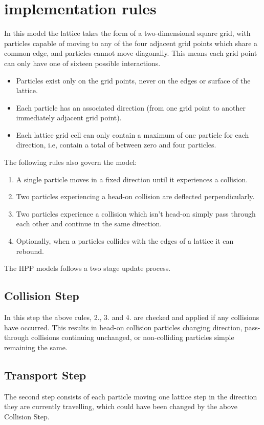 \documentclass[paper=a4, fontsize=11pt]{scrartcl} %
\numberwithin{equation}{section} %
\numberwithin{figure}{section} %
\numberwithin{table}{section} %
\begin{document}
\section{implementation rules}
In this model the lattice takes the form of a two-dimensional square grid, with particles capable of moving to any of the four adjacent grid points which share a common edge, and particles cannot move diagonally. This means each grid point can only have one of sixteen possible interactions.
\begin{itemize}
	\item Particles exist only on the grid points, never on the edges or surface of the lattice.
	\item Each particle has an associated direction (from one grid point to another immediately adjacent grid point).
	\item Each lattice grid cell can only contain a maximum of one particle for each direction, i.e, contain a total of between zero and four particles.
\end{itemize}
The following rules also govern the model:
\begin{enumerate}
	\item A single particle moves in a fixed direction until it experiences a collision.
	\item Two particles experiencing a head-on collision are deflected perpendicularly.
	\item Two particles experience a collision which isn't head-on simply pass through each other and continue in the same direction.
	\item Optionally, when a particles collides with the edges of a lattice it can rebound.
\end{enumerate}
The HPP models follows a two stage update process. \cite{wiki-hpp}

\subsection{Collision Step}
In this step the above rules, 2., 3. and 4. are checked and applied if any collisions have occurred. This results in head-on collision particles changing direction, pass-through collisions continuing unchanged, or non-colliding particles simple remaining the same. \cite{wiki-hpp}

\subsection{Transport Step}
The second step consists of each particle moving one lattice step in the direction they are currently travelling, which could have been changed by the above Collision Step. \cite{wiki-hpp}
\end{document}
